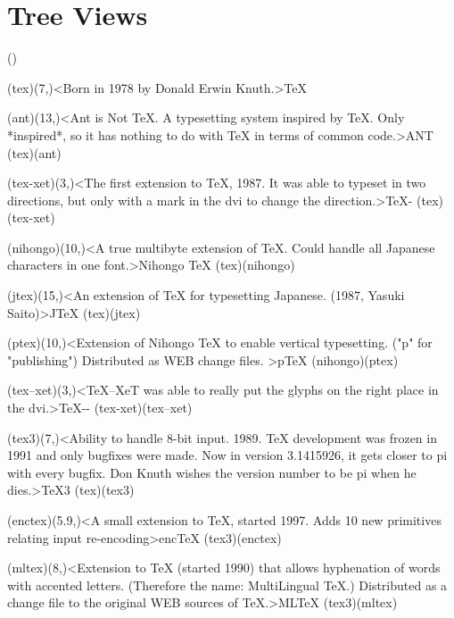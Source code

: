 \documentclass[
%
]{scrartcl}
\begin{document}
\setlength{\columnsep}{1.5cm}
\twocolumn
\tableofcontents


\part{Tree Views}
\clearpage

\label{sec:tree}
\Large
\centering

\label{textextview}
\tograph*({}){
	\tonode[\vip](tex)(7,\layer)<Born in 1978 by Donald Erwin Knuth.>{\TeX}
	
	\tonode[\program](ant)(13,\layer)<Ant is Not TeX. A typesetting system inspired by TeX. Only *inspired*, so it has nothing to do with TeX in terms of common code.>{ANT}
	\todraw[dotted](tex)(ant)
	
	\steplayer[-1.5]
	\tonode(tex-xet)(3,\layer)<The first extension to TeX, 1987. It was able to typeset in two directions, but only with a mark in the dvi to change the direction.>{\TeX-\XeT}
	\todraw(tex)(tex-xet)

	\tonode(nihongo)(10,\layer)<A true multibyte extension of TeX. Could handle all Japanese characters in one font.>{Nihongo \TeX}
	\todraw(tex)(nihongo)
	
	\tonode(jtex)(15,\layer)<An extension of TeX for typesetting Japanese. (1987, Yasuki Saito)>{J\TeX}
	\todraw(tex)(jtex)

	\steplayer[-1.5]
	\tonode(ptex)(10,\layer)<Extension of Nihongo TeX to enable vertical typesetting. ("p" for "publishing")  Distributed as WEB change files. >{p\TeX}
	\todraw(nihongo)(ptex)

	\steplayer[-1.5]
	\tonode(tex--xet)(3,\layer)<TeX--XeT was able to really put the glyphs on the right place in the dvi.>{\TeX-{}-\XeT}
	\todraw(tex-xet)(tex--xet)
	
	\tonode[\vip](tex3)(7,\layer)<Ability to handle 8-bit input. 1989. TeX development was frozen in 1991 and only bugfixes were made. Now in version 3.1415926, it gets closer to pi with every bugfix. Don Knuth wishes the version number to be pi when he dies.>{\TeX3}
	\todraw*(tex)(tex3)
	
	\steplayer[-2]
	\tonode(enctex)(5.9,\layer)<A small extension to TeX, started 1997. Adds 10 new primitives relating input re-encoding>{enc\TeX}
	\todraw(tex3)(enctex)
	
	\tonode(mltex)(8,\layer)<Extension to TeX (started 1990) that allows hyphenation of words with accented letters. (Therefore the name: MultiLingual TeX.) Distributed as a change file to the original WEB sources of TeX.>{ML\TeX}
	\todraw(tex3)(mltex)
	
}
\end{document}
